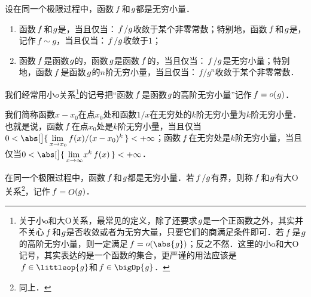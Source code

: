 \begin{definition*}
  设在同一个极限过程中，函数\(\,f\mkern2mu\)和\(\mkern1mu g\)都是无穷小量．
  \begin{enumerate}[topsep=3pt,itemsep=0ex]
    \renewcommand{\labelenumi}{\enumparen{\arabic{enumi}}}
  \item 函数\(\,f\mkern2mu\)和\(\mkern1mu g\)是，当且仅当：\(\,f\mkern2mu/g\)收敛于某个非零常数；特别地，函数\(\,f\mkern2mu\)和\(\mkern1mu g\)是\mbox{}，记作\(\,f \sim g\)，当且仅当：\(\,f\mkern2mu/g\)收敛于\(1\)；
  \item 函数\(\,f\mkern2mu\)是函数\(\mkern1mu g\)的，函数\(\mkern2mu g\)是函数\(\,f\mkern2mu\)的，当且仅当：\(\,f\mkern2mu/g\)是无穷小量；特别地，函数\(\,f\mkern2mu\)是函数\(\mkern2mu g\)的\(n\)阶无穷小量，当且仅当：\(\,f/g^n\!\)收敛于某个非零常数．
  \end{enumerate}

  \begin{remark}
    我们经常用小\(o\)关系\footnote{关于小o和大O关系，最常见的定义，除了还要求\(\mkern1mu g\)是一个正函数之外，其实并不关心\(\,f\mkern2mu\)和\(\mkern1mu g\)是否收敛或者为无穷大量，只要它们的商满足条件即可．若\(\,f\mkern2mu\)是\(\mkern1mu g\)的高阶无穷小量，则一定满足\(\,f = \littleo(\abs{\mkern1mu g})\)；反之不然．这里的小o和大O记号，其实表达的是一个函数的集合，更严谨的用法应该是\(\,f \in \littleop{\mkern1mu g}\)和\(\,f \in \bigOp{\mkern1mu g}\)．}的记号把“函数\(\,f\mkern2mu\)是函数\(\mkern1mu g\)的高阶无穷小量”记作\(\,f= \mathop{\relax o}\nolimits(\mkern1mu g)\)．
  \end{remark}

  \begin{remark}
    我们简称函数\(x-x_0\)在点\(x_0\)处和函数\(1/x\)在无穷处的\(k\)阶无穷小量为\(k\)阶无穷小量．也就是说，函数\(\,f\mkern2mu\)在点\(x_0\)处是\(k\)阶无穷小量，当且仅当\(0 < \abs[\big]{\,\lim\limits_{x \to x_0\!} {\,f(x)}/{(x-x_0)^k}\,} < +\infty\)；函数\(\,f\mkern2mu\)在无穷处是\(k\)阶无穷小量，当且仅当\(0 < \abs[\big]{\,\lim\limits_{x\to\infty\!} x^k\,f(x)\,} < +\infty\)．
  \end{remark}
\end{definition*}

\begin{definition*}
  在同一个极限过程中，函数\(\,f\mkern2mu\)和\(\mkern1mu g\)都是无穷小量．若\(\,f\mkern2mu/g\)有界，则称\(\,f\mkern2mu\)和\(\mkern1mu g\)有大O关系\footnote{同上．}，记作\(\,f = \mathop{\relax O}\nolimits(g)\)．
\end{definition*}

